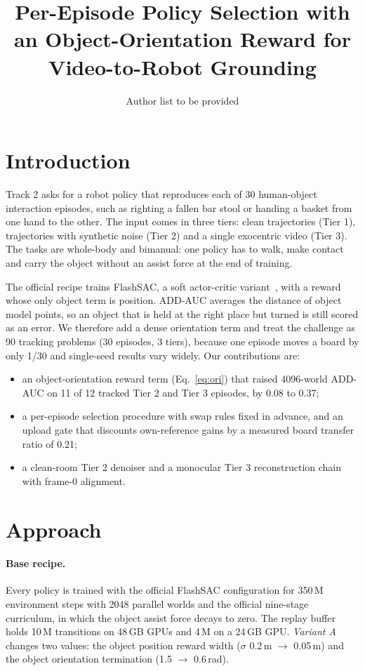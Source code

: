 \documentclass[10pt]{nvidiaextabstract}
\title{Per-Episode Policy Selection with an Object-Orientation Reward for Video-to-Robot Grounding}
\author[1]{Author list to be provided}
\affil[1]{maniphysAI lab}
\begin{document}
\maketitle


\section{Introduction}
\label{sec:intro}

Track 2 asks for a robot policy that reproduces each of 30 human-object interaction episodes, such as righting a fallen bar stool or handing a basket from one hand to the other.
The input comes in three tiers: clean trajectories (Tier 1), trajectories with synthetic noise (Tier 2) and a single exocentric video (Tier 3).
The tasks are whole-body and bimanual: one policy has to walk, make contact and carry the object without an assist force at the end of training.

The official recipe trains FlashSAC, a soft actor-critic variant~\cite{haarnoja2018sac}, with a reward whose only object term is position.
ADD-AUC averages the distance of object model points, so an object that is held at the right place but turned is still scored as an error.
We therefore add a dense orientation term and treat the challenge as 90 tracking problems (30 episodes, 3 tiers), because one episode moves a board by only 1/30 and single-seed results vary widely.
Our contributions are:
\begin{itemize}
  \item an object-orientation reward term (Eq.~\ref{eq:ori}) that raised 4096-world ADD-AUC on 11 of 12 tracked Tier 2 and Tier 3 episodes, by 0.08 to 0.37;
  \item a per-episode selection procedure with swap rules fixed in advance, and an upload gate that discounts own-reference gains by a measured board transfer ratio of 0.21;
  \item a clean-room Tier 2 denoiser and a monocular Tier 3 reconstruction chain with frame-0 alignment.
\end{itemize}

\section{Approach}
\label{sec:approach}

\paragraph{Base recipe.}
Every policy is trained with the official FlashSAC configuration for 350\,M environment steps with 2048 parallel worlds and the official nine-stage curriculum, in which the object assist force decays to zero.
The replay buffer holds 10\,M transitions on 48\,GB GPUs and 4\,M on a 24\,GB GPU.
\emph{Variant A} changes two values: the object position reward width ($\sigma$ 0.2\,m $\rightarrow$ 0.05\,m) and the object orientation termination (1.5 $\rightarrow$ 0.6\,rad).
\end{document}
